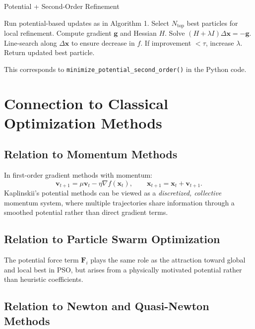 \documentclass[12pt]{article}
\begin{document}
\begin{algorithm}[h!]
\caption{Potential + Second-Order Refinement}
\begin{algorithmic}[1]
\STATE Run potential-based updates as in Algorithm 1.
\STATE Select $N_\text{top}$ best particles for local refinement.
        \STATE Compute gradient $\mathbf{g}$ and Hessian $H$.
        \STATE Solve $(H+\lambda I)\Delta \mathbf{x} = -\mathbf{g}$.
        \STATE Line-search along $\Delta \mathbf{x}$ to ensure decrease in $f$.
        \STATE If improvement $< \tau$, increase $\lambda$.
    \ENDFOR
\ENDFOR
\STATE Return updated best particle.
\end{algorithmic}
\end{algorithm}

This corresponds to \texttt{minimize\_potential\_second\_order()} in the Python code.

\section{Connection to Classical Optimization Methods}

\subsection{Relation to Momentum Methods}

In first-order gradient methods with momentum:
\[
\mathbf{v}_{t+1} = \mu \mathbf{v}_t - \eta \nabla f(\mathbf{x}_t), \qquad
\mathbf{x}_{t+1} = \mathbf{x}_t + \mathbf{v}_{t+1}.
\]
Kaplinskii’s potential methods can be viewed as a \emph{discretized, collective} momentum system, where multiple trajectories share information through a smoothed potential rather than direct gradient terms.

\subsection{Relation to Particle Swarm Optimization}

The potential force term $\mathbf{F}_i$ plays the same role as the attraction toward global and local best in PSO, but arises from a physically motivated potential rather than heuristic coefficients.

\subsection{Relation to Newton and Quasi-Newton Methods}
\end{document}
